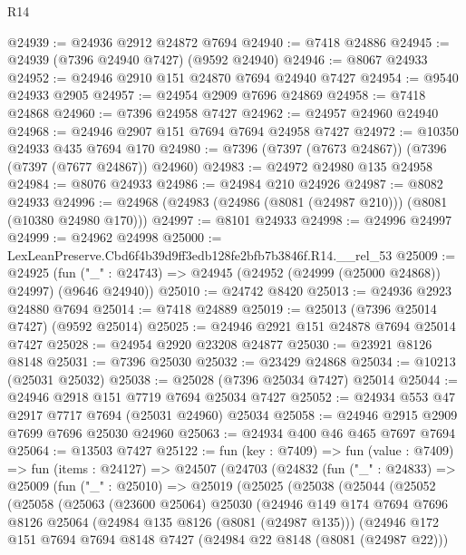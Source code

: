 \begin{lexlean}{R14}
\begin{coremodule}
@24939 := @24936 @2912 @24872 @7694
@24940 := @7418 @24886
@24945 := @24939 (@7396 @24940 @7427) (@9592 @24940)
@24946 := @8067 @24933
@24952 := @24946 @2910 @151 @24870 @7694 @24940 @7427
@24954 := @9540 @24933 @2905
@24957 := @24954 @2909 @7696 @24869
@24958 := @7418 @24868
@24960 := @7396 @24958 @7427
@24962 := @24957 @24960 @24940
@24968 := @24946 @2907 @151 @7694 @7694 @24958 @7427
@24972 := @10350 @24933 @435 @7694 @170
@24980 := @7396 (@7397 (@7673 @24867)) (@7396 (@7397 (@7677 @24867)) @24960)
@24983 := @24972 @24980 @135 @24958
@24984 := @8076 @24933
@24986 := @24984 @210 @24926
@24987 := @8082 @24933
@24996 := @24968 (@24983 (@24986 (@8081 (@24987 @210))) (@8081 (@10380 @24980 @170)))
@24997 := @8101 @24933
@24998 := @24996 @24997
@24999 := @24962 @24998
@25000 := LexLeanPreserve.Cbd6f4b39d9ff3edb128fe2bfb7b3846f.R14.__rel_53
@25009 := @24925
    (fun ("_" : @24743) => @24945 (@24952 (@24999 (@25000 @24868)) @24997) (@9646 @24940))
@25010 := @24742 @8420
@25013 := @24936 @2923 @24880 @7694
@25014 := @7418 @24889
@25019 := @25013 (@7396 @25014 @7427) (@9592 @25014)
@25025 := @24946 @2921 @151 @24878 @7694 @25014 @7427
@25028 := @24954 @2920 @23208 @24877
@25030 := @23921 @8126 @8148
@25031 := @7396 @25030
@25032 := @23429 @24868
@25034 := @10213 (@25031 @25032)
@25038 := @25028 (@7396 @25034 @7427) @25014
@25044 := @24946 @2918 @151 @7719 @7694 @25034 @7427
@25052 := @24934 @553 @47 @2917 @7717 @7694 (@25031 @24960) @25034
@25058 := @24946 @2915 @2909 @7699 @7696 @25030 @24960
@25063 := @24934 @400 @46 @465 @7697 @7694
@25064 := @13503 @7427
@25122 := fun (key : @7409) =>
  fun (value : @7409) =>
  fun (items : @24127) =>
  @24507
    (@24703
      (@24832
        (fun ("_" : @24833) =>
        @25009
          (fun ("_" : @25010) =>
          @25019
            (@25025
              (@25038
                (@25044
                  (@25052
                    (@25058
                      (@25063
                        (@23600 @25064)
                        @25030
                        (@24946
                          @149
                          @174
                          @7694
                          @7696
                          @8126
                          @25064
                          (@24984 @135 @8126 (@8081 (@24987 @135)))
                          (@24946
                            @172
                            @151
                            @7694
                            @7694
                            @8148
                            @7427
                            (@24984 @22 @8148 (@8081 (@24987 @22)))

\end{coremodule}
\end{lexlean}

